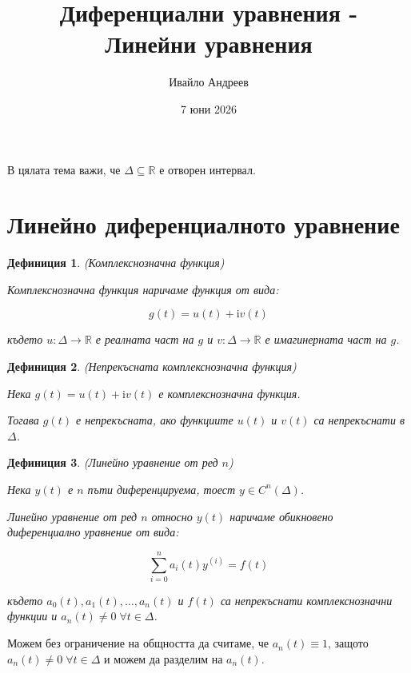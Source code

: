 \documentclass{scrartcl}
\title{Диференциални уравнения -\\ Линейни уравнения}
\author{Ивайло Андреев}
\date{7 юни 2026}
\newtheorem{definition}{Дефиниция}
\begin{document}
\maketitle

\tableofcontents

\newpage

\begin{FlushLeft}

В цялата тема важи, че $\Delta \subseteq \mathbb{R}$ е отворен интервал.

\section{Линейно диференциалното уравнение}

\begin{definition}
(Комплекснозначна функция)

Комплекснозначна функция наричаме функция от вида:

$$g(t) = u(t) + \mathrm{i}v(t)$$

където $u: \Delta \rightarrow \mathbb{R}$ е реалната част на $g$ и $v: \Delta \rightarrow \mathbb{R}$ е имагинерната част на $g$.
\end{definition}

\begin{definition}
(Непрекъсната комплекснозначна функция)

Нека $g(t) = u(t) + \mathrm{i}v(t)$ е комплекснозначна функция.

Тогава $g(t)$ е непрекъсната, ако функциите $u(t)$ и $v(t)$ са непрекъснати в $\Delta$.
\end{definition}

\begin{definition}
(Линейно уравнение от ред $n$)

Нека $y(t)$ е $n$ пъти диференцируема, тоест $y \in C^n(\Delta)$.

Линейно уравнение от ред $n$ относно $y(t)$ наричаме обикновено диференциално уравнение от вида:

\begin{equation}\label{eq:general_linear}
    \sum_{i=0}^n a_i(t)y^{(i)} = f(t)
\end{equation}

където $a_0(t), a_1(t), \dots, a_n(t)$ и $f(t)$ са непрекъснати комплекснозначни функции и $a_n(t) \ne 0 \; \forall t \in \Delta$.
\end{definition}

Можем без ограничение на общността да считаме, че $a_n(t) \equiv 1$, защото $a_n(t) \ne 0 \; \forall t \in \Delta$ и можем да разделим на $a_n(t)$.


\end{FlushLeft}
\end{document}
